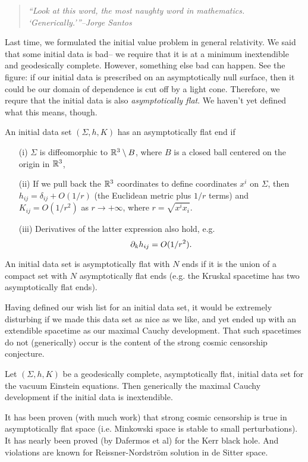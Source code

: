 \begin{quote}
    \textit{``Look at this word, the most naughty word in mathematics. `Generically.'{}''--Jorge Santos}
\end{quote}

Last time, we formulated the initial value problem in general relativity. We said that some initial data is bad-- we require that it is at a minimum inextendible and geodesically complete. However, something else bad can happen. See the figure:
if our initial data is prescribed on an asymptotically null surface, then it could be our domain of dependence is cut off by a light cone. Therefore, we requre that the initial data is also \emph{asymptotically flat}. We haven't yet defined what this means, though.

\begin{defn}
    An initial data set $(\Sigma,h,K)$ has an asymptotically flat end if
    \begin{itemize}
        \item[(i)] $\Sigma$ is diffeomorphic to $\mathbb{R}^3 \setminus B$, where $B$ is a closed ball centered on the origin in $\mathbb{R}^3$,
        \item[(ii)] If we pull back the $\mathbb{R}^3$ coordinates to define coordinates $x^i$ on $\Sigma$, then $h_{ij}=\delta_{ij}+O(1/r)$ (the Euclidean metric plus $1/r$ terms) and $K_{ij}=O(1/r^2)$ as $r\to +\infty$, where $r=\sqrt{x^i x_i}$.
        \item[(iii)] Derivatives of the latter expression also hold, e.g.
        \begin{equation*}
            \partial_k h_{ij}=O(1/r^2).
        \end{equation*}
    \end{itemize}
\end{defn}
\begin{defn}
    An initial data set is asymptotically flat with $N$ ends if it is the union of a compact set with $N$ asymptotically flat ends (e.g. the Kruskal spacetime has two asymptotically flat ends).
\end{defn}
Having defined our wish list for an initial data set, it would be extremely disturbing if we made this data set as nice as we like, and yet ended up with an extendible spacetime as our maximal Cauchy development. That such spacetimes do not (generically) occur is the content of the strong cosmic censorship conjecture.
\begin{thm}
    Let $(\Sigma,h,K)$ be a geodesically complete, asymptotically flat, initial data set for the vacuum Einstein equations. Then generically the maximal Cauchy development if the initial data is inextendible.
\end{thm}
It has been proven (with much work) that strong cosmic censorship is true in asymptotically flat space (i.e. Minkowski space is stable to small perturbations). It has nearly been proved (by Dafermos et al) for the Kerr black hole. And violations are known for Reissner-Nordstr\"om solution in de Sitter space.

